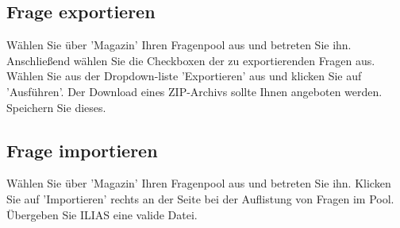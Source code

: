 \documentclass[12pt,a4paper]{scrreprt}
\begin{document}
\subsection{Frage exportieren}
Wählen Sie über 'Magazin' Ihren Fragenpool aus und betreten Sie ihn. Anschließend wählen Sie die Checkboxen der zu exportierenden Fragen aus. Wählen Sie aus der Dropdown-liste 'Exportieren' aus und klicken Sie auf 'Ausführen'. Der Download eines ZIP-Archivs sollte Ihnen angeboten werden. Speichern Sie dieses.
		
\subsection{Frage importieren}
Wählen Sie über 'Magazin' Ihren Fragenpool aus und betreten Sie ihn. Klicken Sie auf 'Importieren' rechts an der Seite bei der Auflistung von Fragen im Pool. Übergeben Sie ILIAS eine valide Datei. 
\end{document}
